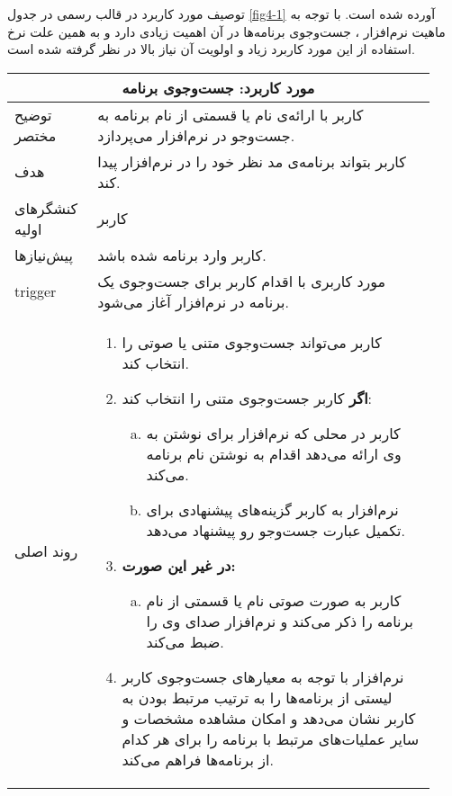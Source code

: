{\begin{enumerate}[a)]
توصیف مورد کاربرد در قالب رسمی در جدول \ref{fig4-1} آورده شده است. با توجه به ماهیت نرم‌افزار
،
 جست‌وجوی برنامه‌ها در آن اهمیت زیادی دارد و به همین علت نرخ استفاده از این مورد کاربرد زیاد و اولویت آن نیاز بالا در نظر گرفته شده است.
 	
\newpage
\begin{center}
\begin{table}[h!]
	\centering
	\begin{tabular}{|p{0.18\linewidth}|p{0.75\linewidth}|} 
		\hline
		\multicolumn{2}{|c|}{مورد کاربرد: 
	جست‌وجوی برنامه	
	}  \\ 
		\hline
		توضیح مختصر     &     کاربر با ارائه‌ی نام یا قسمتی از نام برنامه به جست‌وجو در نرم‌افزار می‌پردازد.             \\ 
		\hline
	هدف     &     کاربر بتواند برنامه‌ی مد نظر خود را در نرم‌افزار پیدا کند.             \\ 
		\hline
		کنشگرهای اولیه  &    کاربر                  \\ 
		\hline
		پیش‌نیازها      &      کاربر وارد برنامه شده باشد.               \\ 
		\hline
		trigger     &    مورد کاربری با اقدام کاربر برای جست‌وجوی یک برنامه در نرم‌افزار آغاز می‌شود.            \\ 
		\hline
		روند اصلی       &   
		
\begin{enumerate}[1.]
\item
کاربر می‌تواند جست‌وجوی متنی یا صوتی را انتخاب کند.
\item
\textbf{اگر}
 کاربر جست‌وجوی متنی را انتخاب کند:
	\begin{enumerate}[a.]
		\item
	کاربر در محلی که نرم‌افزار برای نوشتن به وی ارائه می‌دهد اقدام به نوشتن نام برنامه می‌کند.
		\item
	نرم‌افزار به کاربر گزینه‌های پیشنهادی برای تکمیل عبارت جست‌وجو رو پیشنهاد می‌دهد.
	\end{enumerate}
\item
\textbf{در غیر این صورت:}
	\begin{enumerate}[a.]
		\item
		کاربر به صورت صوتی نام یا قسمتی از نام برنامه را ذکر می‌کند و نرم‌افزار صدای وی را ضبط می‌کند.
	\end{enumerate}

\item
نرم‌افزار با توجه به معیارهای جست‌وجوی کاربر لیستی از برنامه‌ها را به ترتیب مرتبط بودن به کاربر نشان می‌دهد و امکان مشاهده مشخصات و سایر عملیات‌های مرتبط با برنامه را برای هر کدام از برنامه‌ها فراهم می‌کند.


\end{enumerate}
\end{tabular}
\end{table}
\end{center}
\end{enumerate}}
